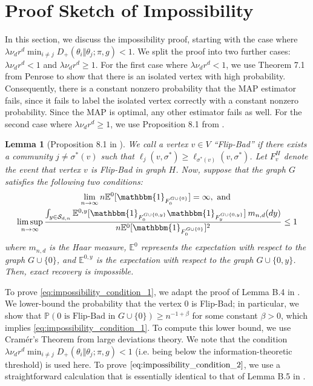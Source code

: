 \documentclass{article}
\renewcommand{\P}{\mathbb{P}}
\newcommand{\E}{\mathbb{E}}
\newcommand{\1}{\mathbbm{1}}
\newcommand{\calS}{\mathcal{S}}
\theoremstyle{definition}
\theoremstyle{plain}
\newtheorem{lemma}{Lemma}
\begin{document}
\section{Proof Sketch of Impossibility}
\label{sec:proof_sketch_impossibility}
In this section, we discuss the impossibility proof, starting with the case where $\lambda \nu_d r^d \min_{i \neq j} D_+(\theta_i \Vert \theta_j ; \pi ,g) < 1$. We split the proof into two further cases: $\lambda \nu_d r^d < 1$ and $\lambda \nu_d r^d \geq 1$. For the first case where $\lambda \nu_d r^d < 1$, we use Theorem 7.1 from Penrose \cite{Penrose2003} to show that there is an isolated vertex with high probability. Consequently, there is a constant nonzero probability that the MAP estimator fails, since it fails to label the isolated vertex correctly with a constant nonzero probability. Since the MAP is optimal, any other estimator fails as well. For the second case where $\lambda \nu_d r^d \geq 1$, we use Proposition 8.1 from \cite{Abbe+2020}.

\begin{lemma}[Proposition 8.1 in \cite{Abbe+2020}]
\label{lem:impossibility_lemma}
    We call a vertex $v \in V$ ``Flip-Bad'' if there exists a community $j \neq \sigma^*(v)$ such that $\ell_j(v, \sigma^*) \geq \ell_{\sigma^*(v)}(v, \sigma^*)$. Let $F_v^H$ denote the event that vertex $v$ is Flip-Bad in graph $H$. Now, suppose that the graph $G$ satisfies the following two conditions:
    \begin{gather}
    \label{eq:impossibility_condition_1} \lim_{n\to\infty} n\E^{0}[\1_{F_0^{G \cup \{0\}}}] = \infty, \text{ and } \\
    \label{eq:impossibility_condition_2} \limsup_{n\to\infty} \frac{\int_{y \in \calS_{d,n}} \E^{0,y}[\1_{F_0^{G \cup \{0, y\}}} \1_{F_y^{G \cup \{0, y\}}} ] \: m_{n,d}(dy)}{n\E^{0}[\1_{F_0^{G \cup \{0\}}}]^2} \leq 1
    \end{gather}
    where $m_{n,d}$ is the Haar measure, $\E^0$ represents the expectation with respect to the graph $G \cup \{0\}$, and $\E^{0,y}$ is the expectation with respect to the graph $G \cup \{0, y\}$. Then, exact recovery is impossible.
\end{lemma}

To prove \eqref{eq:impossibility_condition_1}, we adapt the proof of Lemma B.4 in \cite{Gaudio+2025}. We lower-bound the probability that the vertex $0$ is Flip-Bad; in particular, we show that $\P(0 \text{ is Flip-Bad in } G \cup \{0\}) \geq  n^{-1 + \beta}$ for some constant $\beta > 0$, which implies \eqref{eq:impossibility_condition_1}. To compute this lower bound, we use Cram\'er's Theorem from large deviations theory. We note that the condition $\lambda \nu_d r^d \min_{i \neq j} D_+(\theta_i\Vert \theta_j ; \pi ,g) < 1$ (i.e. being below the information-theoretic threshold) is used here. To prove $\eqref{eq:impossibility_condition_2}$, we use a straightforward calculation that is essentially identical to that of Lemma B.5 in \cite{Gaudio+2025}.
\end{document}
